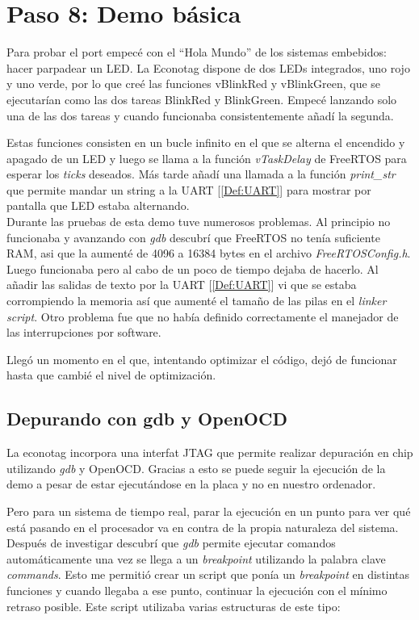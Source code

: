 \section{Paso 8: Demo básica}
Para probar el port empecé con el ``Hola Mundo'' de los sistemas embebidos: hacer parpadear un LED. La Econotag dispone de dos LEDs integrados, uno rojo y uno verde, por lo que creé las funciones vBlinkRed y vBlinkGreen, que se ejecutarían como las dos tareas BlinkRed y BlinkGreen. Empecé lanzando solo una de las dos tareas y cuando funcionaba consistentemente añadí la segunda.

Estas funciones consisten en un bucle infinito en el que se alterna el encendido y apagado de un LED y luego se llama a la función \emph{vTaskDelay} de FreeRTOS para esperar los \emph{ticks} deseados. Más tarde añadí una llamada a la función \emph{print\_str} que permite mandar un string a la UART [\ref{Def:UART}] para mostrar por pantalla que LED estaba alternando.\\


Durante las pruebas de esta demo tuve numerosos problemas. Al principio no funcionaba y avanzando con \emph{gdb} descubrí que FreeRTOS no tenía suficiente RAM, asi que la aumenté de 4096 a 16384 bytes en el archivo \emph{FreeRTOSConfig.h}. Luego funcionaba pero al cabo de un poco de tiempo dejaba de hacerlo. Al añadir las salidas de texto por la UART [\ref{Def:UART}] vi que se estaba corrompiendo la memoria así que aumenté el tamaño de las pilas en el \emph{linker script}. Otro problema fue que no había definido correctamente el manejador de las interrupciones por software.

Llegó un momento en el que, intentando optimizar el código, dejó de funcionar hasta que cambié el nivel de optimización.

\subsection{Depurando con gdb y OpenOCD}
La econotag incorpora una interfat JTAG que permite realizar depuración en chip utilizando \emph{gdb} y OpenOCD. Gracias a esto se puede seguir la ejecución de la demo a pesar de estar ejecutándose en la placa y no en nuestro ordenador.

Pero para un sistema de tiempo real, parar la ejecución en un punto para ver qué está pasando en el procesador va en contra de la propia naturaleza del sistema. Después de investigar descubrí que \emph{gdb} permite ejecutar comandos automáticamente una vez se llega a un \emph{breakpoint} utilizando la palabra clave \emph{commands}. Esto me permitió crear un script que ponía un \emph{breakpoint} en distintas funciones y cuando llegaba a ese punto, continuar la ejecución con el mínimo retraso posible. Este script utilizaba varias estructuras de este tipo:

